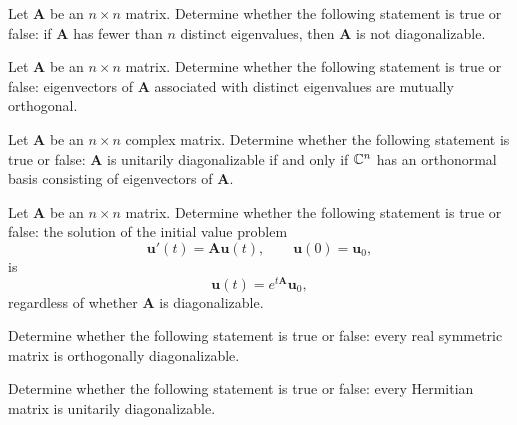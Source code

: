 \begin{problem}
Let $\mathbf A$ be an $n\times n$ matrix. Determine whether the following statement is true or false: if $\mathbf A$ has fewer than $n$ distinct eigenvalues, then $\mathbf A$ is not diagonalizable.
\end{problem}

\begin{problem}
Let $\mathbf A$ be an $n\times n$ matrix. Determine whether the following statement is true or false: eigenvectors of $\mathbf A$ associated with distinct eigenvalues are mutually orthogonal.
\end{problem}

\begin{problem}
Let $\mathbf A$ be an $n\times n$ complex matrix. Determine whether the following statement is true or false: $\mathbf A$ is unitarily diagonalizable if and only if $\mathbb{C}^n$ has an orthonormal basis consisting of eigenvectors of $\mathbf A$.
\end{problem}

\begin{problem}
Let $\mathbf A$ be an $n\times n$ matrix. Determine whether the following statement is true or false: the solution of the initial value problem
\[
\mathbf u'(t)=\mathbf A\mathbf u(t),
\qquad
\mathbf u(0)=\mathbf u_0,
\]
is
\[
\mathbf u(t)=e^{t\mathbf A}\mathbf u_0,
\]
regardless of whether $\mathbf A$ is diagonalizable.
\end{problem}

\begin{problem}
Determine whether the following statement is true or false: every real symmetric matrix is orthogonally diagonalizable.
\end{problem}

\begin{problem}
Determine whether the following statement is true or false: every Hermitian matrix is unitarily diagonalizable.
\end{problem}

